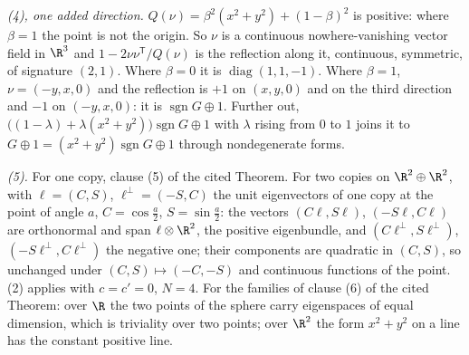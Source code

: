 \emph{(4), one added direction.} $Q(\nu) = \beta^{2}(x^{2} + y^{2}) + (1 - \beta)^{2}$ is positive: where $\beta = 1$ the point is not the origin. So $\nu$ is a continuous nowhere-vanishing vector field in $\R^{3}$ and $1 - 2\nu\nu^{\mathsf T}/Q(\nu)$ is the reflection along it, continuous, symmetric, of signature $(2,1)$. Where $\beta = 0$ it is $\operatorname{diag}(1,1,-1)$. Where $\beta = 1$, $\nu = (-y, x, 0)$ and the reflection is $+1$ on $(x,y,0)$ and on the third direction and $-1$ on $(-y,x,0)$: it is $\operatorname{sgn} G \oplus 1$. Further out, $\bigl((1-\lambda) + \lambda(x^{2} + y^{2})\bigr)\operatorname{sgn} G \oplus 1$ with $\lambda$ rising from $0$ to $1$ joins it to $G \oplus 1 = (x^{2} + y^{2})\operatorname{sgn} G \oplus 1$ through nondegenerate forms.

\emph{(5).} For one copy, clause (5) of the cited Theorem. For two copies on $\R^{2} \oplus \R^{2}$, with $\ell = (C,S)$, $\ell^{\perp} = (-S,C)$ the unit eigenvectors of one copy at the point of angle $a$, $C = \cos\tfrac a2$, $S = \sin\tfrac a2$: the vectors $(C\ell, S\ell)$, $(-S\ell, C\ell)$ are orthonormal and span $\ell \otimes \R^{2}$, the positive eigenbundle, and $(C\ell^{\perp}, S\ell^{\perp})$, $(-S\ell^{\perp}, C\ell^{\perp})$ the negative one; their components are quadratic in $(C,S)$, so unchanged under $(C,S) \mapsto (-C,-S)$ and continuous functions of the point. (2) applies with $c = c' = 0$, $N = 4$. For the families of clause (6) of the cited Theorem: over $\R$ the two points of the sphere carry eigenspaces of equal dimension, which is triviality over two points; over $\R^{2}$ the form $x^{2} + y^{2}$ on a line has the constant positive line.
